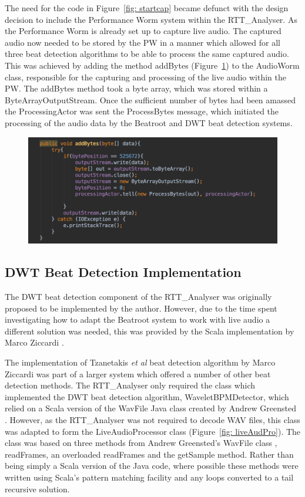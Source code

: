 \documentclass[a4paper, 11pt]{article}
\begin{document}
The need for the code in Figure~\ref{fig: startcap} became defunct with the design decision to include the Performance Worm system within the RTT\_Analyser. As the Performance Worm is already set up to capture live audio. The captured audio now needed to be stored by the PW in a manner which allowed for all three beat detection algorithms to be able to process the same captured audio. This was achieved by adding the method addBytes (Figure~\ref{fig: addBytes}) to the AudioWorm class, responsible for the capturing and processing of the live audio within the PW. The addBytes method took a byte array, which was stored within a ByteArrayOutputStream. Once the sufficient number of bytes had been amassed the ProcessingActor was sent the ProcessBytes message, which initiated the processing of the audio data by the Beatroot and DWT beat detection systems.

\begin{figure}[ht]
	\centering
	\includegraphics[scale=0.25]{images/addBytes.jpg}
	\caption{}
	\label{fig: addBytes}
\end{figure}

\subsection{DWT Beat Detection Implementation}
The DWT beat detection component of the RTT\_Analyser was originally proposed to be implemented by the author. However, due to the time spent investigating how to adapt the Beatroot system to work with live audio a different solution was needed, this was provided by the Scala implementation by Marco Ziccardi \cite{marcoZin}.

The implementation of Tzanetakis \textit{et al} beat detection algorithm by Marco Ziccardi \cite{marcoZin} was part of a larger system which offered a number of other beat detection methods. The RTT\_Analyser only required the class which implemented the DWT beat detection algorithm, WaveletBPMDetector, which relied on a Scala version of the WavFile Java class created by Andrew Greensted \cite{green}. However, as the RTT\_Analyser was not required to decode WAV files, this class was adapted to form the LiveAudioProcessor class (Figure~\ref{fig: liveAudPro}). The class was based on three methods from Andrew Greensted's WavFile class \cite{green}, readFrames, an overloaded readFrames and the getSample method. Rather than being simply a Scala version of the Java code, where possible these methods were written using Scala's pattern matching facility and any loops converted to a tail recursive solution.\par
\end{document}
